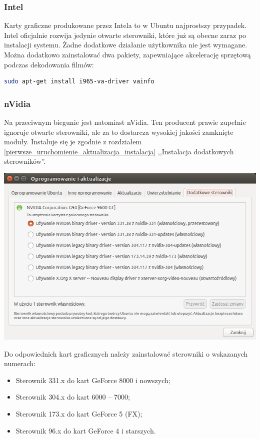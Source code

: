 \subsubsection{Intel}
Karty graficzne produkowane przez Intela to w Ubuntu najprostszy przypadek. Intel oficjalnie rozwija jedynie otwarte sterowniki, które już są obecne zaraz po instalacji systemu. Żadne dodatkowe działanie użytkownika nie jest wymagane. Można dodatkowo zainstalować dwa pakiety, zapewniające akcelerację sprzętową podczas dekodowania filmów:

\begin{lstlisting}[language=bash]
sudo apt-get install i965-va-driver vainfo
\end{lstlisting}

\subsubsection{nVidia}
Na przeciwnym biegunie jest natomiast nVidia. Ten producent prawie zupełnie ignoruje otwarte sterowniki, ale za to dostarcza wysokiej jakości zamknięte moduły. Instaluje się je zgodnie z rozdziałem \ref{pierwsze_uruchomienie_aktualizacja_instalacja} ,,Instalacja dodatkowych sterowników''. 

\begin{center}
	\includegraphics[width=\linewidth]{images/pierwsze_uruchomienie_driver2.png}
\end{center}

Do odpowiednich kart graficznych należy zainstalować sterowniki o wskazanych numerach:
\begin{itemize}
\item Sterownik 331.x do kart GeForce 8000 i nowszych;
\item Sterownik 304.x do kart 6000 -- 7000;
\item Sterownik 173.x do kart GeForce 5 (FX);
\item Sterownik 96.x do kart GeForce 4 i starszych.
\end{itemize}

